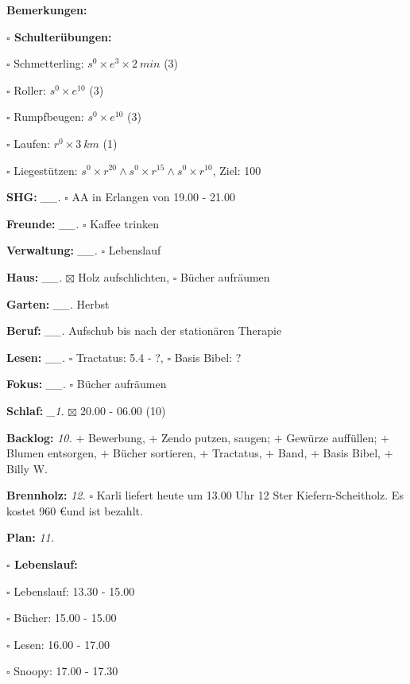 \documentclass[10pt,a4paper]{article}
\newcommand\prop[1] {{\color {alizarin} {\bf #1}}}             %
\newcommand\draf[1] {{\color {amber(sae/ece)} {\bf #1}}}       %
\newcommand\opti[1] {{\color {amethyst} {\bf #1}}}             %
\newcommand\mand[1] {{\color {burntorange} {\bf #1}}}          %
\newcommand\topspace{\vskip -15pt \hskip 20pt}
\newcommand\bottomspace{\vskip 4pt}
\newcommand\n[1] { {\sl #1.} \hskip 5pt }
\begin{document}
\begin{mdframed}[style=daystyle]
\begin{labeling}{{\mand {Bemerkungen:}}}
\begin{minipage}{0.75\textwidth}
\begin{labeling}{\prop {$\square$ {Schulterübungen:}}}
      \item[$\square$ Schmetterling:]   $s^0 \times e^3 \times 2\ min$ (3)
      \item[$\square$ Roller:]          $s^0 \times e^{10}$ (3)
      \item[$\square$ Rumpfbeugen:]     $s^0 \times e^{10}$ (3)
      \item[$\square$ Laufen:]          $r^0 \times 3\ km$ (1)
      \item[$\square$ Liegestützen:]    $s^0 \times r^{20} \land s^0 \times r^{15} \land s^0 \times r^{10}$, Ziel: 100
      \end{labeling}
    \end{minipage}
    \bottomspace        
  \item[{\mand {SHG:}}]          \n{\_\_} $\square$ AA in Erlangen von 19.00 - 21.00
  \item[{\mand {Freunde:}}]      \n{\_\_} $\square$ Kaffee trinken
  \item[{\mand {Verwaltung:}}]   \n{\_\_} $\square$ Lebenslauf
  \item[{\mand {Haus:}}]         \n{\_\_} $\boxtimes$ Holz aufschlichten, $\square$ Bücher aufräumen
  \item[{\mand {Garten:}}]       \n{\_\_} Herbst
  \item[{\mand {Beruf:}}]        \n{\_\_} Aufschub bis nach der stationären Therapie
  \item[{\mand {Lesen:}}]        \n{\_\_} $\square$ Tractatus: 5.4 - ?, $\square$ Basis Bibel: ?
  \item[{\mand {Fokus:}}]        \n{\_\_} $\square$ Bücher aufräumen
  \item[{\mand {Schlaf:}}]        \n{\_1} $\boxtimes$ 20.00 - 06.00 (10)
  \item[{\mand {Backlog:}}]        \n{10} 
    $+$ Bewerbung,
    $+$ Zendo putzen, saugen; $+$ Gewürze auffüllen; $+$ Blumen entsorgen, $+$ Bücher sortieren,
    $+$ Tractatus, $+$ Band, $+$ Basis Bibel, $+$ Billy W.
  \item[{\opti {Brennholz:}}]      \n{12} $\square$ Karli liefert heute um 13.00 Uhr 12 Ster Kiefern-Scheitholz.
    Es kostet 960 \euro und ist bezahlt.
  \item[{\mand {Plan:}}]           \n{11}
    \topspace
    \begin{minipage}{0.75\textwidth}  
      \begin{labeling}{\draf {$\square$ {Lebenslauf:}}} 
        \setlength\itemsep{-3pt}
      \item[$\square$ Lebenslauf:] 13.30 - 15.00
      \item[$\square$ Bücher:]     15.00 - 15.00
      \item[$\square$ Lesen:]      16.00 - 17.00
      \item[$\square$ Snoopy:]     17.00 - 17.30
        

\end{labeling}
\end{minipage}
\end{labeling}
\end{mdframed}
\end{document}
